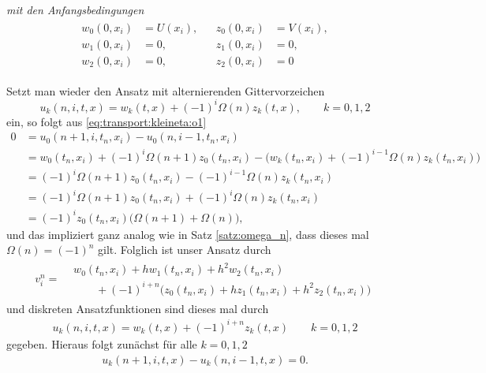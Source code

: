 \emph{mit den Anfangsbedingungen}
\begin{align}\label{eq:transport:kleineta:anfangsbedinungen}
\begin{split}
w_0(0, x_i) &= U(x_i),\\
w_1(0, x_i) &= 0,\\
w_2(0, x_i) &= 0,
\end{split}&
\begin{split}
z_0(0, x_i) &= V(x_i),\\
z_1(0, x_i) &= 0,\\
z_2(0, x_i) &= 0
\end{split}
\end{align}

Setzt man wieder den Ansatz mit alternierenden Gittervorzeichen
\[ u_k(n, i, t, x) = w_k(t, x) + (-1)^i \Omega(n) z_k(t, x), \qquad k = 0,1,2 \]
ein, so folgt aus \eqref{eq:transport:kleineta:o1}
\begin{align*}
0 &= u_0(n+1, i, t_n, x_i) - u_0(n, i-1, t_n, x_i)\\
&= w_0(t_n, x_i) + (-1)^i \Omega(n+1) z_0(t_n, x_i) - \bigl( w_k(t_n, x_i) + (-1)^{i-1} \Omega(n) z_k(t_n, x_i) \bigr)\\
&= (-1)^i \Omega(n+1) z_0(t_n, x_i) - (-1)^{i-1} \Omega(n) z_k(t_n, x_i)\\
&= (-1)^i \Omega(n+1) z_0(t_n, x_i) + (-1)^{i} \Omega(n) z_k(t_n, x_i)\\
&= (-1)^i z_0(t_n, x_i) \bigl( \Omega(n+1) + \Omega(n) \bigr),
\end{align*}
und das impliziert ganz analog wie in Satz \ref{satz:omega_n}, dass dieses mal $\Omega(n) = (-1)^n$ gilt.
Folglich ist unser Ansatz durch
\begin{align}
v^n_i = \begin{split}
&w_0(t_n, x_i) + h w_1(t_n, x_i) + h^2 w_2(t_n, x_i)\\
&\qquad + (-1)^{i+n} \bigl( z_0(t_n, x_i) + h z_1(t_n, x_i) + h^2 z_2(t_n, x_i) \bigr)
\end{split}
\end{align}
und diskreten Ansatzfunktionen sind dieses mal durch
\begin{align}\label{eq:ke:ansatz} u_k(n, i, t, x) = w_k(t,x) + (-1)^{i+n} z_k(t, x) \qquad k = 0,1,2 \end{align}
gegeben. Hieraus folgt zunächst für alle $k = 0,1,2$
\begin{align}\label{eq:appendix:kleineta:bedingung}
u_k(n+1, i, t, x) - u_k(n, i-1, t, x) = 0.
\end{align}
